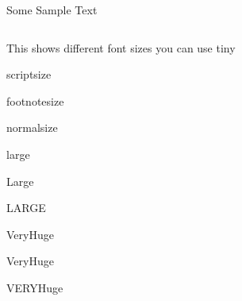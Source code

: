 \documentclass[final]{beamer}
\begin{document}
\begin{frame}{}
\begin{columns}[t]
\begin{column}{.48\linewidth}
\begin{block}{Some Sample Text}
        \end{block}

      \end{column}
    \end{columns}

  \vfill
    \begin{block}{\large This shows different font sizes you can use}
      \centering
      {\tiny tiny}\par
      {\scriptsize scriptsize}\par
      {\footnotesize footnotesize}\par
      {\normalsize normalsize}\par
      {\large large}\par
      {\Large Large}\par
      {\LARGE LARGE}\par
      {\veryHuge VeryHuge}\par
      {\VeryHuge VeryHuge}\par
      {\VERYHuge VERYHuge}\par
    \end{block}
    \vfill

  \end{frame}
\end{document}
